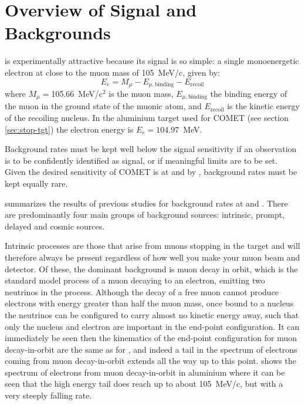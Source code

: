 \section{Overview of Signal and Backgrounds}
\TabBackgroundSummary
\mueconv is experimentally attractive because its signal is so simple: a single monoenergetic electron at close to the muon mass of 105~MeV/c, given by:
\begin{equation}
E_e=M_\mu-E_{\mu,\mathrm{binding}}-E_\mathrm{recoil}
\end{equation}
where $M_\mu=$105.66~MeV/c$^2$ is the muon mass, $E_{\mu,\mathrm{binding}}$ the
binding energy of the muon in the ground state of the muonic atom, and
$E_\mathrm{recoil}$ is the kinetic energy of the recoiling nucleus.
In the aluminium target used for COMET (see section \ref{sec:stop-tgt}) the electron energy is $E_e=104.97$~MeV.

Background rates must be kept well below the signal sensitivity if an observation is to be confidently identified as signal, or if meaningful limits are to be set.
Given the desired sensitivity of COMET is \sensePI  at \phaseI and \sensePII by \phaseII, background rates must be kept equally rare.

 summarizes the results of previous studies for background rates at \phaseI and \phaseII.
There are predominantly four main groups of background sources: intrinsic, prompt, delayed and cosmic sources.

Intrinsic processes are those that arise from muons stopping in the target and will therefore always be present regardless of how well you make your muon beam and detector.
Of these, the dominant background is muon decay in orbit, which is the standard model process of a muon decaying to an electron, emitting two neutrinos in the process.
Although the decay of a free muon cannot produce electrons with energy greater than half the muon mass, once bound to a nucleus the neutrinos can be configured to carry almost no kinetic energy away, such that only the nucleus and electron are important in the end-point configuration.
It can immediately be seen then the kinematics of the end-point configuration for muon decay-in-orbit are the same as for \mueconv, and indeed
a tail in the spectrum of electrons coming from muon decay-in-orbit extends all the way up to this point.
 shows the spectrum of electrons from muon decay-in-orbit in aluminium where it can be seen that the high energy tail does reach up to about 105~MeV/c, but with a very steeply falling rate.

